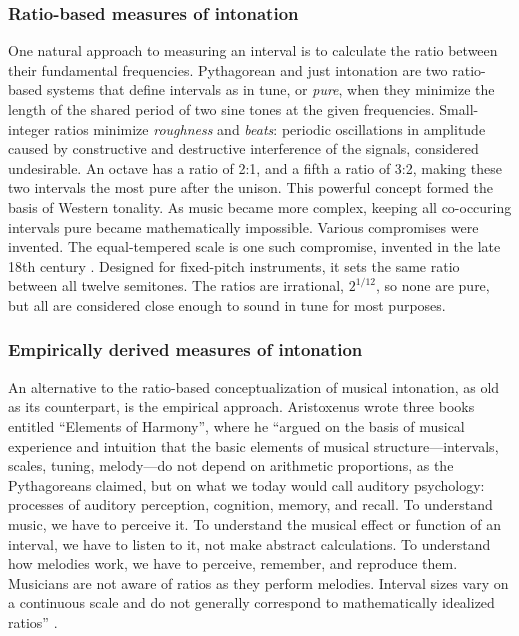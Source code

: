 \subsubsection{Ratio-based measures of intonation}
\label{sec:ratio}
One natural approach to measuring an interval is to calculate the ratio between their fundamental frequencies. Pythagorean and just intonation are two ratio-based systems that define intervals as in tune, or \textit{pure}, when they minimize the length of the shared period of two sine tones at the given frequencies. Small-integer ratios minimize \textit{roughness} and \textit{beats}: periodic oscillations in amplitude caused by constructive and destructive interference of the signals, considered undesirable. An octave has a ratio of 2:1, and a fifth a ratio of 3:2, making these two intervals the most pure after the unison. This powerful concept formed the basis of Western tonality. As music became more complex, keeping all co-occuring intervals pure became mathematically impossible. Various compromises were invented. The equal-tempered scale is one such compromise, invented in the late 18th century \cite{equaltemperament}. Designed for fixed-pitch instruments, it sets the same ratio between all twelve semitones. The ratios are irrational, $2^{1/12}$, so none are pure, but all are considered close enough to sound in tune for most purposes. 

\subsubsection{Empirically derived measures of intonation}
\label{sec:empirical}
An alternative to the ratio-based conceptualization of musical intonation, as old as its counterpart, is the empirical approach. Aristoxenus wrote three books entitled ``Elements of Harmony'', where he ``argued on the basis of musical experience and intuition that the basic elements of musical structure---intervals, scales, tuning, melody---do not depend on arithmetic  proportions, as the Pythagoreans claimed, but on what we today would call auditory psychology: processes of auditory perception, cognition, memory, and recall. To understand music, we have to perceive it. To understand the musical effect or function of an interval, we have to listen to it, not make abstract calculations. To understand how melodies work, we have to perceive, remember, and reproduce them. Musicians are not aware of ratios as they perform melodies. Interval sizes vary on a continuous scale and do not generally correspond to mathematically idealized ratios'' \cite{parncutt2018psychocultural}. 

